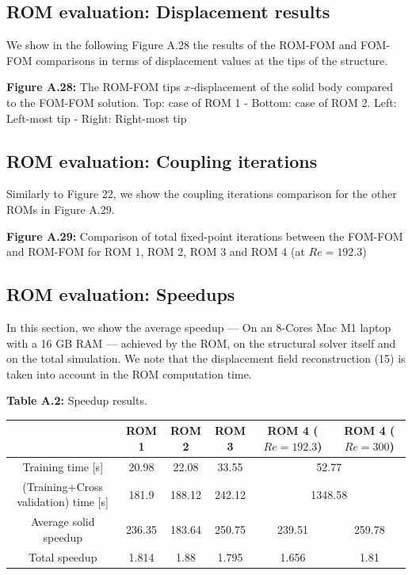 \documentclass[11pt]{article}
\begin{document}
\subsection{ROM evaluation: Displacement results}

We show in the following Figure A.28 the results of the ROM-FOM and FOM-FOM comparisons in terms of displacement values at the tips of the structure.

\begin{center}
\textbf{Figure A.28:} The ROM-FOM tips $x$-displacement of the solid body compared to the FOM-FOM solution. Top: case of ROM 1 - Bottom: case of ROM 2. Left: Left-most tip - Right: Right-most tip
\end{center}

\subsection{ROM evaluation: Coupling iterations}

Similarly to Figure 22, we show the coupling iterations comparison for the other ROMs in Figure A.29.

\begin{center}
\textbf{Figure A.29:} Comparison of total fixed-point iterations between the FOM-FOM and ROM-FOM for ROM 1, ROM 2, ROM 3 and ROM 4 (at $Re = 192.3$)
\end{center}

\subsection{ROM evaluation: Speedups}

In this section, we show the average speedup --- On an 8-Cores Mac M1 laptop with a 16 GB RAM --- achieved by the ROM, on the structural solver itself and on the total simulation. We note that the displacement field reconstruction (15) is taken into account in the ROM computation time.

\begin{center}
\textbf{Table A.2:} Speedup results.
\end{center}

\begin{center}
\begin{tabular}{|c|c|c|c|c|c|}
\hline
 & \textbf{ROM 1} & \textbf{ROM 2} & \textbf{ROM 3} & \textbf{ROM 4} ($Re = 192.3$) & \textbf{ROM 4} ($Re = 300$) \\
\hline
Training time [s] & 20.98 & 22.08 & 33.55 & \multicolumn{2}{c|}{52.77} \\
\hline
(Training+Cross validation) time [s] & 181.9 & 188.12 & 242.12 & \multicolumn{2}{c|}{1348.58} \\
\hline
Average solid speedup & 236.35 & 183.64 & 250.75 & 239.51 & 259.78 \\
\hline
Total speedup & 1.814 & 1.88 & 1.795 & 1.656 & 1.81 \\
\hline
\end{tabular}
\end{center}
\end{document}
